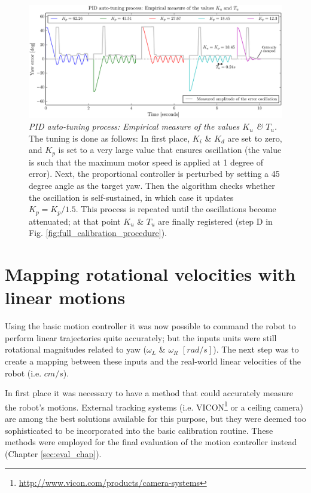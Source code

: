 \documentclass[12pt,twoside]{report}
\begin{document}
\begin{figure}[hbtp]
\centerline{
\includegraphics[width=1.2\linewidth]{PID_auto_tuning}}
\caption[PID auto-tuning process: Empirical measure of the values $K_u$ \& $T_u$]{\emph{PID auto-tuning process: Empirical measure of the values $K_u$ \& $T_u$.}
The tuning is done as follows: In first place, $K_i$ \& $K_d$ are set to zero, and $K_p$ is set to a very large value that ensures oscillation (the value is such that the maximum motor speed is applied at 1 degree of error). Next, the proportional controller is perturbed by setting a 45 degree angle as the target yaw. Then the algorithm checks whether the oscillation is self-sustained, in which case it updates $K_p=K_p/1.5$. This process is repeated until the oscillations become attenuated; at that point $K_u$ \& $T_u$ are finally registered (step D in Fig. \ref{fig:full_calibration_procedure}).
}
\label{fig:PID_auto_tuning}
\end{figure}






\section{Mapping rotational velocities with linear motions} \label{sec:linearVel_section}

Using the basic motion controller it was now possible to command the robot to perform linear trajectories quite accurately; but the inputs units were still rotational magnitudes related to yaw ($\omega_L$ \& $\omega_R$ $[rad/s]$). The next step was to create a mapping between these inputs and the real-world linear velocities of the robot (i.e. $cm/s$).

In first place it was necessary to have a method that could accurately measure the robot's motions.
External tracking systems (i.e. VICON\footnote{\url{http://www.vicon.com/products/camera-systems}} or a ceiling camera) are among the best solutions available for this purpose, but they were deemed too sophisticated to be incorporated into the basic calibration routine. These methods were employed for the final evaluation of the motion controller instead (Chapter \ref{sec:eval_chap}).
\end{document}
